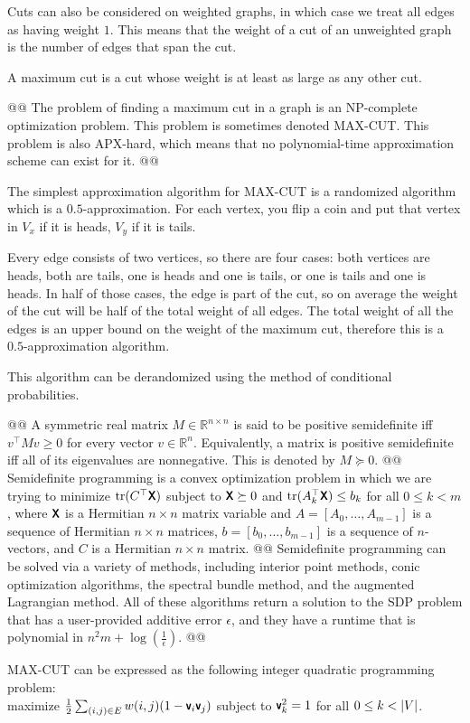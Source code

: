 \documentclass[]{article}
\DeclarePairedDelimiter{\abs}{\lvert}{\rvert}
\newcommand{\textbs}[1]{{\sffamily\fontseries{sbc}\selectfont #1}}
\newcommand{\mathbs}[1]{\ensuremath{\text{\textbs{#1}}}}
\newcommand{\mbs}[1]{\ensuremath{\mathbs{#1}}}     %
\newcommand{\mbb}[1]{\ensuremath{\mathbb{#1}}}     %
\DeclareMathOperator{\tr}{tr}
\newcommand{\define}[1]{\textbs{#1}}
\begin{document}
\begin{easylist}[itemize]
{  Cuts can also be considered on weighted graphs, in which case we treat all
  edges as having weight $1$. This means that the weight of a cut of an
  unweighted graph is the number of edges that span the cut.

  A maximum cut is a cut whose weight is at least as large as any other cut.
}
@@ {%
  The problem of finding a maximum cut in a graph is an NP-complete optimization
  problem. This problem is sometimes denoted \textsf{MAX-CUT}. This problem is
  also APX-hard, which means that no polynomial-time approximation scheme can
  exist for it.
}
@@ {%
  The simplest approximation algorithm for \textsf{MAX-CUT} is a randomized
  algorithm which is a $0.5$-approximation. For each vertex, you
  flip a coin and put that vertex in $V_x$ if it is heads, $V_y$ if it is tails.

  Every edge consists of two vertices, so there are four cases: both vertices
  are heads, both are tails, one is heads and one is tails, or one is tails and
  one is heads. In half of those cases, the edge is part of the cut, so on
  average the weight of the cut will be half of the total weight of all edges.
  The total weight of all the edges is an upper bound on the weight of the
  maximum cut, therefore this is a $0.5$-approximation algorithm.

  This algorithm can be derandomized using the method of conditional
  probabilities.
}
@@ {%
  A symmetric real matrix $M \in \mbb{R}^{n \times n}$ is said to be
  \define{positive semidefinite} iff $v^\top M v \ge 0$ for every
  vector $v \in \mbb{R}^n$. Equivalently, a matrix is positive semidefinite iff
  all of its eigenvalues are nonnegative. This is denoted by $M \succeq 0$.
}
@@ {%
  \define{Semidefinite programming} is a convex optimization problem in which
  we are trying to minimize $\tr(C^\top \mbs{X})$ subject to $\mbs{X} \succeq 0$
  and $\tr(A_k^\top \mbs{X}) \le b_k$ for all $0 \le k < m$, where
  $\mbs{X}$ is a Hermitian $n \times n$ matrix variable and
  $A = [A_0, \ldots, A_{m - 1}]$ is a sequence of Hermitian $n \times n$
  matrices, $b = [b_0, \ldots, b_{m - 1}]$ is a sequence of $n$-vectors,
  and $C$ is a Hermitian $n \times n$ matrix.
}
@@ {%
  Semidefinite programming can be solved via a variety of methods, including
  interior point methods, conic optimization algorithms, the spectral bundle
  method, and the augmented Lagrangian method. All of these algorithms return
  a solution to the SDP problem that has a user-provided additive error
  $\epsilon$, and they have a runtime that is polynomial in
  $n^2 m + \log(\frac{1}{\epsilon})$.
}
@@ {%
  \textsf{MAX-CUT} can be expressed as the following integer quadratic programming problem: \\
  maximize $\frac{1}{2} \sum_{(i, j) \in E} w(i, j) (1 - \mbs{v}_i \mbs{v}_j)$
  subject to $\mbs{v}_k^2 = 1$ for all $0 \le k < \abs{V}$.

}
\end{easylist}
\end{document}
